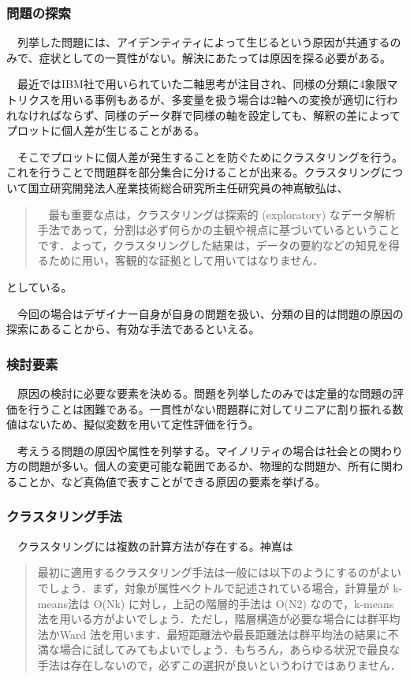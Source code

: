 \documentclass{jsarticle}
\begin{document}
\subsubsection{問題の探索}
　列挙した問題には、アイデンティティによって生じるという原因が共通するのみで、症状としての一貫性がない。解決にあたっては原因を探る必要がある。

　最近ではIBM社で用いられていた二軸思考が注目され、同様の分類に4象限マトリクスを用いる事例もあるが、多変量を扱う場合は2軸への変換が適切に行われなければならず、同様のデータ群で同様の軸を設定しても、解釈の差によってプロットに個人差が生じることがある。

　そこでプロットに個人差が発生することを防ぐためにクラスタリングを行う。これを行うことで問題群を部分集合に分けることが出来る。クラスタリングについて国立研究開発法人産業技術総合研究所主任研究員の神嶌敏弘\cite{kamishima}は、

\begin{quotation}
　最も重要な点は，クラスタリングは探索的 (exploratory) なデータ解析手法であって，分割は必ず何らかの主観や視点に基づいているということです．よって，クラスタリングした結果は，データの要約などの知見を得るために用い，客観的な証拠として用いてはなりません．
\end{quotation}

としている。

　今回の場合はデザイナー自身が自身の問題を扱い、分類の目的は問題の原因の探索にあることから、有効な手法であるといえる。
　

\subsubsection{検討要素}
　原因の検討に必要な要素を決める。問題を列挙したのみでは定量的な問題の評価を行うことは困難である。一貫性がない問題群に対してリニアに割り振れる数値はないため、擬似変数を用いて定性評価を行う。

　考えうる問題の原因や属性を列挙する。マイノリティの場合は社会との関わり方の問題が多い。個人の変更可能な範囲であるか、物理的な問題か、所有に関わることか、など真偽値で表すことができる原因の要素を挙げる。

\subsubsection{クラスタリング手法}
　クラスタリングには複数の計算方法が存在する。神嶌は

\begin{quotation}
最初に適用するクラスタリング手法は一般には以下のようにするのがよいでしょう．まず，対象が属性ベクトルで記述されている場合，計算量が k-means法は O(Nk) に対し，上記の階層的手法は O(N2) なので，k-means法を用いる方がよいでしょう．ただし，階層構造が必要な場合には群平均法かWard 法を用います．最短距離法や最長距離法は群平均法の結果に不満な場合に試してみてもよいでしょう．もちろん，あらゆる状況で最良な手法は存在しないので，必ずこの選択が良いというわけではありません．
\end{quotation}
\end{document}
